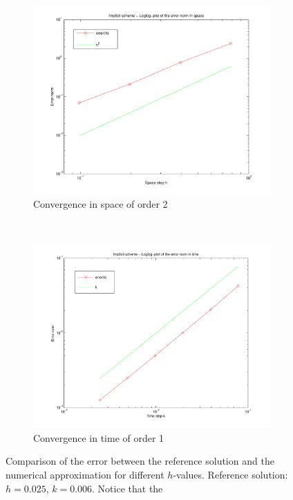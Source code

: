 \begin{figure}[H]
        \centering
        \begin{subfigure}[b]{0.52\textwidth}
                \includegraphics[width=\textwidth]{../PDFs/IMEX/IMEX_space_conv.pdf}
                \caption{Convergence in space of order 2}
                \label{fig:convSpace}
        \end{subfigure}%
        ~ %
        \begin{subfigure}[b]{0.52\textwidth}
                \includegraphics[width=\textwidth]{../PDFs/IMEX/IMEX_time_conv.pdf}
                \caption{Convergence in time of order 1}
                \label{fig:convTime}
        \end{subfigure}
        \caption{Comparison of the error between the reference solution and the numerical approximation for different $h$-values. Reference solution: $h = 0.025$, $k = 0.006$. Notice that the }\label{fig:convergence}
\end{figure}




